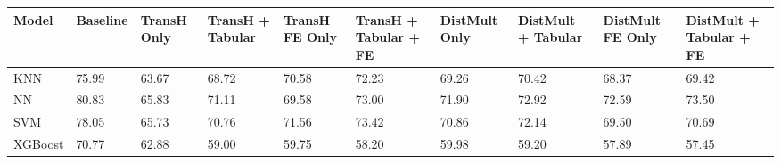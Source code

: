 \begin{tabular}{llllllllll}
\toprule
Model & Baseline & TransH Only & TransH + Tabular & TransH FE Only & TransH + Tabular + FE & DistMult Only & DistMult + Tabular & DistMult FE Only & DistMult + Tabular + FE \\
\midrule
KNN & 75.99 & 63.67 & 68.72 & 70.58 & 72.23 & 69.26 & 70.42 & 68.37 & 69.42 \\
NN & 80.83 & 65.83 & 71.11 & 69.58 & 73.00 & 71.90 & 72.92 & 72.59 & 73.50 \\
SVM & 78.05 & 65.73 & 70.76 & 71.56 & 73.42 & 70.86 & 72.14 & 69.50 & 70.69 \\
XGBoost & 70.77 & 62.88 & 59.00 & 59.75 & 58.20 & 59.98 & 59.20 & 57.89 & 57.45 \\
\bottomrule
\end{tabular}
